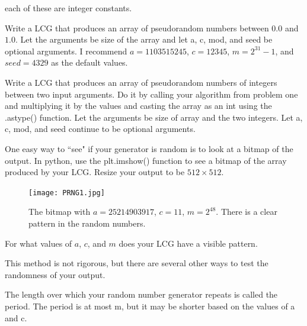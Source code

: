 each of these are integer constants.

\begin{problem}
Write a LCG that produces an array of pseudorandom numbers between $0.0$ and $1.0$.
Let the arguments be size of the array and let a, c, mod, and seed be optional arguments.
I recommend $a=1103515245$, $c=12345$, $m=2^{31}-1$, and $seed=4329$ as the default values.
\end{problem}

\begin{problem}
Write a LCG that produces an array of pseudorandom numbers of integers between two input arguments.
Do it by calling your algorithm from problem one and multiplying it by the values and casting the array as an int using the .astype() function.
Let the arguments be size of array and the two integers.
Let a, c, mod, and seed continue to be optional arguments.
\end{problem}

One easy way to ``see" if your generator is random is to look at a bitmap of the output.
In python, use the plt.imshow() function to see a bitmap of the array produced by your LCG.
Resize your output to be $512 \times 512$.

\begin{figure}[H]
\texttt{[image: PRNG1.jpg]}
\caption{
The bitmap with $a=25214903917$, $c=11$, $m=2^{48}$.
There is a clear pattern in the random numbers.}
\end{figure}

\begin{problem}
For what values of $a$, $c$, and $m$ does your LCG have a visible pattern.
\end{problem}

This method is not rigorous, but there are several other ways to test the randomness of your output.

The length over which your random number generator repeats is called the period.
The period is at most m, but it may be shorter based on the values of a and c.
 

